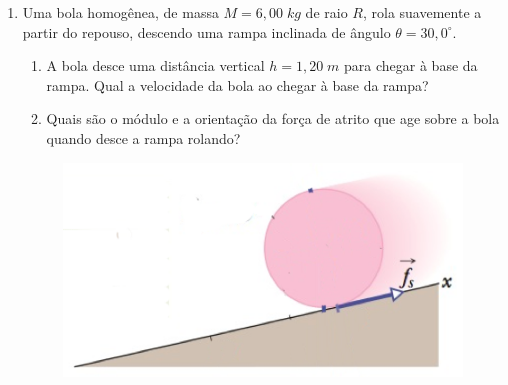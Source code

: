 \documentclass[brazil]{article}
\begin{document}
\begin{enumerate}
\item Uma bola homogênea, de massa $M=6,00\;kg$ de raio $R$, rola suavemente a partir do repouso, descendo uma rampa inclinada de ângulo $\theta=30,0^{\circ}$.
\begin{enumerate}
\item A bola desce uma distância vertical $h=1,20\;m$ para chegar à base da rampa. Qual a velocidade da bola ao chegar à base da rampa?
\item Quais são o módulo e a orientação da força de atrito que age sobre a bola quando desce a rampa rolando?
\end{enumerate}
\begin{figure}[H]
\hfill \includegraphics[scale=0.5]{figs/plano-inclinado01-mod.png}
\end{figure}


\end{enumerate}
\end{document}
